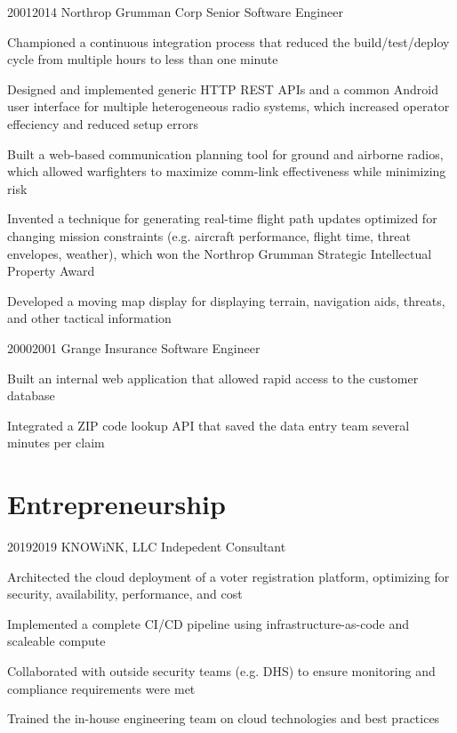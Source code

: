 \documentclass{article}
\begin{document}
\job
  {2001}{2014}
  {Northrop Grumman Corp}
  {Senior Software Engineer}
  {\begin{achievements}
    \item Championed a continuous integration process that reduced the build/test/deploy cycle from multiple hours to less than one minute
    \item Designed and implemented generic HTTP REST APIs and a common Android user interface for multiple heterogeneous radio systems, which increased operator effeciency and reduced setup errors
    \item Built a web-based communication planning tool for ground and airborne radios, which allowed warfighters to maximize comm-link effectiveness while minimizing risk
    \item Invented a technique for generating real-time flight path updates optimized for changing mission constraints (e.g. aircraft performance, flight time, threat envelopes, weather), which won the Northrop Grumman Strategic Intellectual Property Award
    \item Developed a moving map display for displaying terrain, navigation aids, threats, and other tactical information
  \end{achievements}}

\job
  {2000}{2001}
  {Grange Insurance}
  {Software Engineer}
  {\begin{achievements}
    \item Built an internal web application that allowed rapid access to the customer database
    \item Integrated a ZIP code lookup API that saved the data entry team several minutes per claim
  \end{achievements}}

\pagebreak


\section{Entrepreneurship}

\job
  {2019}{2019}
  {KNOWiNK, LLC}
  {Indepedent Consultant}
  {\begin{achievements}
    \item Architected the cloud deployment of a voter registration platform, optimizing for security, availability, performance, and cost
    \item Implemented a complete CI/CD pipeline using infrastructure-as-code and scaleable compute
    \item Collaborated with outside security teams (e.g. DHS) to ensure monitoring and compliance requirements were met
    \item Trained the in-house engineering team on cloud technologies and best practices
  \end{achievements}}
\end{document}
